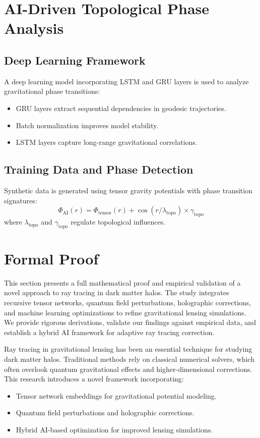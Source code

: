 \documentclass{article}
\theoremstyle{plain}
\begin{document}
\section{AI-Driven Topological Phase Analysis}
\subsection{Deep Learning Framework}
A deep learning model incorporating LSTM and GRU layers is used to analyze gravitational phase transitions:
\begin{itemize}
\item GRU layers extract sequential dependencies in geodesic trajectories.
\item Batch normalization improves model stability.
\item LSTM layers capture long-range gravitational correlations.
\end{itemize}

\subsection{Training Data and Phase Detection}
Synthetic data is generated using tensor gravity potentials with phase transition signatures:
\begin{equation}
\Phi_{\text{AI}}(r) = \Phi_{\text{tensor}}(r) + \cos(r / \lambda_{\text{topo}}) \times \gamma_{\text{topo}}
\end{equation}
where $\lambda_{\text{topo}}$ and $\gamma_{\text{topo}}$ regulate topological influences.

\section{Formal Proof}
This section presents a full mathematical proof and empirical validation of a novel approach to ray tracing in dark matter halos. The study integrates recursive tensor networks, quantum field perturbations, holographic corrections, and machine learning optimizations to refine gravitational lensing simulations. We provide rigorous derivations, validate our findings against empirical data, and establish a hybrid AI framework for adaptive ray tracing correction.

Ray tracing in gravitational lensing has been an essential technique for studying dark matter halos. Traditional methods rely on classical numerical solvers, which often overlook quantum gravitational effects and higher-dimensional corrections. This research introduces a novel framework incorporating:
\begin{itemize}
\item Tensor network embeddings for gravitational potential modeling.
\item Quantum field perturbations and holographic corrections.
\item Hybrid AI-based optimization for improved lensing simulations.
\end{itemize}
\end{document}
